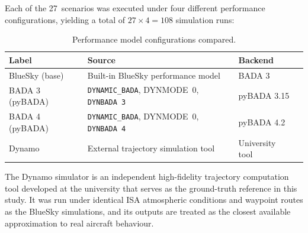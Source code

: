 Each of the 27~scenarios was executed under four different performance configurations, yielding a total of $27 \times 4 = 108$ simulation runs:

\begin{table}[H]
\centering
\caption{Performance model configurations compared.}
\label{tab:models_compared}
\begin{tabular}{llll}
\hline
\textbf{Label} & \textbf{Source} & \textbf{Backend} \\
\hline
BlueSky (base) & Built-in BlueSky performance model & BADA 3 \\
BADA 3 (pyBADA) & \texttt{DYNAMIC\_BADA}, DYNMODE~0, \texttt{DYNBADA~3} & pyBADA 3.15 \\
BADA 4 (pyBADA) & \texttt{DYNAMIC\_BADA}, DYNMODE~0, \texttt{DYNBADA~4} & pyBADA 4.2 \\
Dynamo & External trajectory simulation tool & University tool \\
\hline
\end{tabular}
\end{table}
The Dynamo simulator is an independent high-fidelity trajectory computation tool developed at the university that serves as the ground-truth reference in this study. It was run under identical ISA atmospheric conditions and waypoint routes as the BlueSky simulations, and its outputs are treated as the closest available approximation to real aircraft behaviour.


